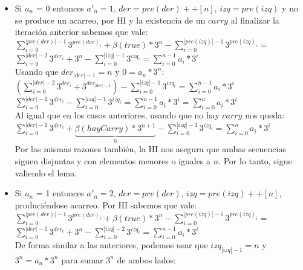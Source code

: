 	\begin{itemize}
	\item Si $a_n$ = 0 entonces $a'_n = 1$, $der = pre(der)++[n]$, $izq = pre(izq)$ y no se produce un acarreo, por HI y la existencia de un $carry$ al finalizar la iteración anterior sabemos que vale: \\

	$\sum_{i=0}^{|pre(der)|-1} 3^{pre(der)_i} + \beta(true)*3^{n} - \sum_{i=0}^{|pre(izq)|-1} 3^{pre(izq)_i} =$
	\\

	$\sum_{i=0}^{|der|-2} 3^{der_i} + 3^{n} - \sum_{i=0}^{|izq|-1} 3^{izq_i} = \sum_{i=0}^{n-1} a_i*3^{i} $
	\\

	Usando que $der_{|der|-1} = n$ y $ 0 = a_{n}*3^{n}$:
	\\

	$(\sum_{i=0}^{|der|-2} 3^{der_i} + 3^{der_{|der|-1}}) - \sum_{i=0}^{|izq|-1} 3^{izq_i} = \sum_{i=0}^{n-1} a_i*3^{i} $
	\\

	$\sum_{i=0}^{|der|-1} 3^{der_i} - \sum_{i=0}^{|izq|-1} 3^{izq_i} = \sum_{i=0}^{n-1} a_i*3^{i} =  \sum_{i=0}^{n} a_i*3^{i} $
	\\

	Al igual que en los casos anteriores, usando que no hay $carry$ nos queda: \\

	$\sum_{i=0}^{|der|-1} 3^{der_i} + \underbrace{\beta(hayCarry)*3^{n+1}}_\text{0} - \sum_{i=0}^{|izq|-1} 3^{izq_i} = \sum_{i=0}^{n} a_i*3^{i} $
	\\

	Por las mismas razones también, la HI nos asegura que ambas secuencias siguen disjuntas y con elementos menores o iguales a $n$. Por lo tanto, sigue valiendo el lema.

	\item Si $a_n$ = 1 entonces $a'_n = 2$, $der = pre(der)$, $izq = pre(izq)++[n]$, produciéndose acarreo. Por HI sabemos que vale: \\

	$\sum_{i=0}^{|pre(der)|-1} 3^{pre(der)_i} + \beta(true)*3^{n} - \sum_{i=0}^{|pre(izq)|-1} 3^{pre(izq)_i} =$
	\\

	$\sum_{i=0}^{|der|-1} 3^{der_i} + 3^{n} - \sum_{i=0}^{|izq|-2} 3^{izq_i} = \sum_{i=0}^{n-1} a_i*3^{i} $
	\\

	De forma similar a las anteriores, podemos usar que $izq_{|izq|-1} = n$ y $ 3^{n} = a_{n}*3^{n}$ para sumar $3^{n}$ de ambos lados:
	\\


\end{itemize}
